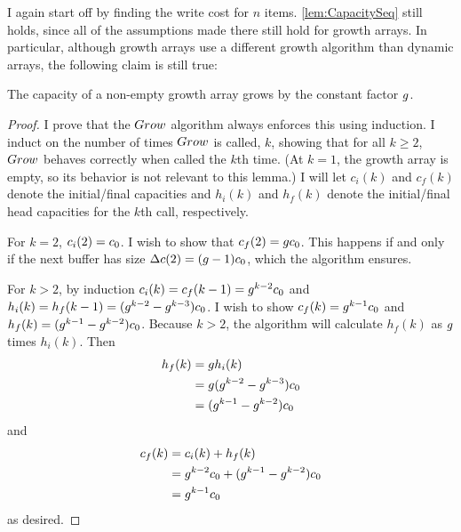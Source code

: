\HdrGrowthArrayImpl

\HdrTimeComplex

I again start off by finding the write cost for $n$ items. \ref{lem:CapacitySeq} still holds, since all of the assumptions made there still hold for growth arrays. In particular, although growth arrays use a different growth algorithm than dynamic arrays, the following claim is still true:

\begin{lemma}
\label{lem:GrowthArraysGrowthFactor}
	The capacity of a non-empty growth array grows by the constant factor $g$.
\end{lemma}

\begin{proof}
	I prove that the $Grow$ algorithm always enforces this using induction. I induct on the number of times $Grow$ is called, $k$, showing that for all $k \geq 2$, $Grow$ behaves correctly when called the $k$th time. (At $k = 1$, the growth array is empty, so its behavior is not relevant to this lemma.) I will let $c_i(k)$ and $c_f(k)$ denote the initial/final capacities and $h_i(k)$ and $h_f(k)$ denote the initial/final head capacities for the $k$th call, respectively.

	For $k = 2$, $c_i(2) = c_0$. I wish to show that $c_f(2) = gc_0$. This happens if and only if the next buffer has size ${\Delta c}(2) = (g - 1)c_0$, which the algorithm ensures.
	
	For $k > 2$, by induction $c_i(k) = c_f(k - 1) = g^{k - 2}c_0$ and $h_i(k) = h_f(k - 1) = (g^{k - 2} - g^{k - 3})c_0$. I wish to show $c_f(k) = g^{k - 1}c_0$ and $h_f(k) = (g^{k - 1} - g^{k - 2})c_0$. Because $k > 2$, the algorithm will calculate $h_f(k)$ as $g$ times $h_i(k)$. Then
	\begin{align*}
	h_f(k) &= g h_i(k)\\
	&= g (g^{k - 2} - g^{k - 3})c_0\\
	&= (g^{k - 1} - g^{k - 2})c_0
	\end{align*}
	and
	\begin{align*}
	c_f(k) &= c_i(k) + h_f(k)\\
	&= g^{k - 2}c_0 + (g^{k - 1} - g^{k - 2})c_0\\
	&= g^{k - 1}c_0
	\end{align*}
	as desired.
\end{proof}

